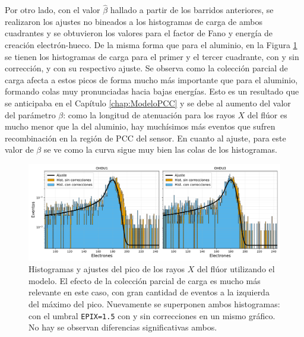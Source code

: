 Por otro lado, con el valor $\hat{\beta}$ hallado a partir de los barridos anteriores, se realizaron los ajustes no bineados a los histogramas de carga de ambos cuadrantes y se obtuvieron los valores para el factor de Fano y energía de creación electrón-hueco. De la misma forma que para el aluminio, en la Figura \ref{fig:F_OHDU1y3_EPIX15conCorr} se tienen los histogramas de carga para el primer y el tercer cuadrante, con y sin corrección, y con su respectivo ajuste. Se observa como la colección parcial de carga afecta a estos picos de forma mucho más importante que para el aluminio, formando colas muy pronunciadas hacia bajas energías. Esto es un resultado que se anticipaba en el Capítulo \ref{chap:ModeloPCC} y se debe al aumento del valor del parámetro $\beta$: como la longitud de atenuación para los rayos $X$ del flúor es mucho menor que la del aluminio, hay muchísimos más eventos que sufren recombinación en la región de PCC del sensor. En cuanto al ajuste, para este valor de $\beta$ se ve como la curva sigue muy bien las colas de los histogramas.
\begin{figure}[h]
    \centering
    \includegraphics[scale=0.5]{Figs/F_hists_ohdu1y3_dobles.pdf}
    \caption{Histogramas y ajustes del pico de los rayos $X$ del flúor utilizando el modelo. El efecto de la colección parcial de carga es mucho más relevante en este caso, con gran cantidad de eventos a la izquierda del máximo del pico. Nuevamente se superponen ambos histogramas: con el umbral \texttt{EPIX=1.5} con y sin correcciones en un mismo gráfico. No hay se observan diferencias significativas ambos.}
    \label{fig:F_OHDU1y3_EPIX15conCorr}
\end{figure}

